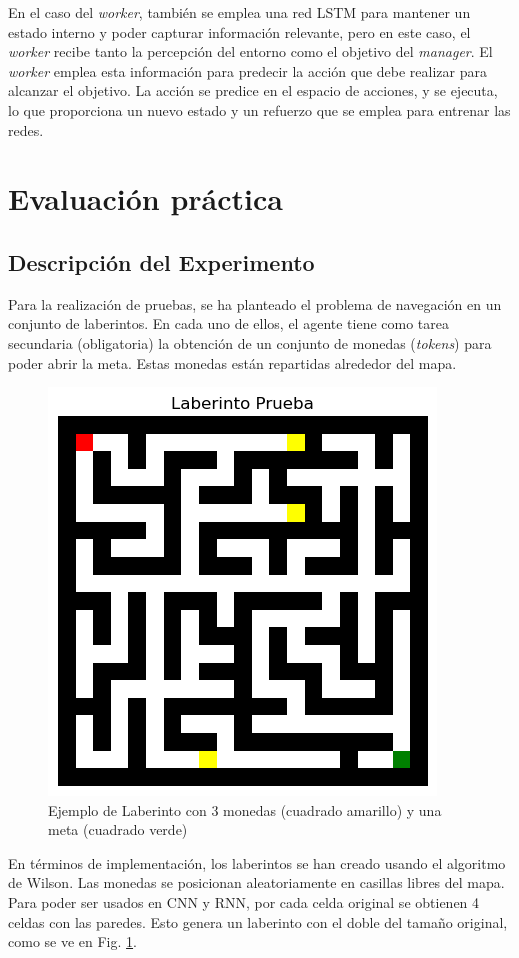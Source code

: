 \documentclass[letterpaper]{article} %
\begin{document}
En el caso del \textit{worker}, también se emplea una red LSTM para mantener un estado interno y poder capturar información relevante,
pero en este caso, el \textit{worker} recibe tanto la percepción del entorno como el objetivo del \textit{manager}. El \textit{worker} emplea esta información
para predecir la acción que debe realizar para alcanzar el objetivo. La acción se predice en el espacio de acciones, y se ejecuta,
lo que proporciona un nuevo estado y un refuerzo que se emplea para entrenar las redes.

\section{Evaluación práctica}
\subsection{Descripción del Experimento}

Para la realización de pruebas, se ha planteado el problema de navegación en un conjunto de laberintos. 
En cada uno de ellos, el agente tiene como tarea secundaria (obligatoria) la obtención de un conjunto de 
monedas (\textit{tokens}) para poder abrir la meta. Estas monedas están repartidas alrededor del mapa.

\begin{figure}[H]
    \centering
    \includegraphics[width=0.7\columnwidth]{maze.png}
    \caption{Ejemplo de Laberinto con 3 monedas (cuadrado amarillo) y una meta (cuadrado verde)\label{fig:maze-example}}
\end{figure}

En términos de implementación, los laberintos se han creado usando el algoritmo de Wilson. Las monedas se posicionan
aleatoriamente en casillas libres del mapa. Para poder ser usados en CNN y RNN, por cada celda original se obtienen 4 celdas con las paredes.
Esto genera un laberinto con el doble del tamaño original, como se ve en Fig. \ref{fig:maze-example}.
\end{document}
